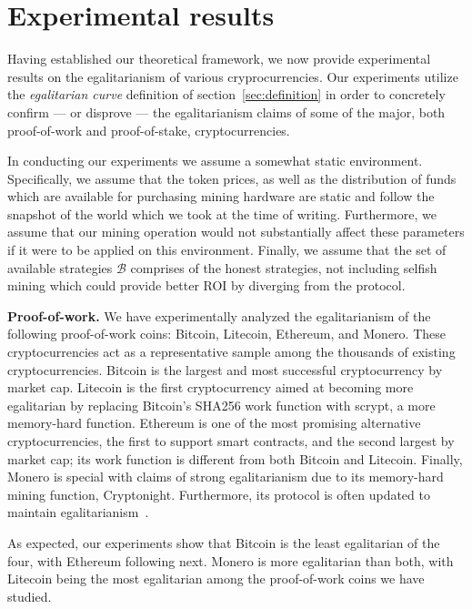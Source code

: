 \section{Experimental results}\label{sec:experiments}

Having established our theoretical framework, we now provide experimental
results on the egalitarianism of various cryprocurrencies. Our experiments
utilize the \emph{egalitarian curve} definition of section~\ref{sec:definition}
in order to concretely confirm --- or disprove --- the egalitarianism claims of
some of the major, both proof-of-work and proof-of-stake, cryptocurrencies.

In conducting our experiments we assume a somewhat static environment.
Specifically, we assume that the token prices, as well as the distribution of
funds which are available for purchasing mining hardware are static and follow
the snapshot of the world which we took at the time of writing. Furthermore, we
assume that our mining operation would not substantially affect these
parameters if it were to be applied on this environment. Finally, we assume
that the set of available strategies $\mathcal{B}$ comprises of the honest
strategies, \eg not including selfish mining which could provide better ROI
by diverging from the protocol.

\noindent\textbf{Proof-of-work.}
\noindent
We have experimentally analyzed the egalitarianism of the following
proof-of-work coins: Bitcoin, Litecoin, Ethereum, and Monero. These
cryptocurrencies act as a representative sample among the thousands of existing
cryptocurrencies. Bitcoin is the largest and most successful cryptocurrency by
market cap. Litecoin is the first cryptocurrency aimed at becoming more
egalitarian by replacing Bitcoin's SHA256 work function with scrypt, a more
memory-hard function. Ethereum is one of the most promising alternative
cryptocurrencies, the first to support smart contracts, and the second largest
by market cap; its work function is different from both Bitcoin and Litecoin.
Finally, Monero is special with claims of strong egalitarianism due to its
memory-hard mining function, Cryptonight. Furthermore, its protocol is often
updated to maintain
egalitarianism~\cite{monero-hard-asic}.

As expected, our experiments show that Bitcoin is the least egalitarian of the
four, with Ethereum following next. Monero is more egalitarian than both, with
Litecoin being the most egalitarian among the proof-of-work coins
we have studied. 

